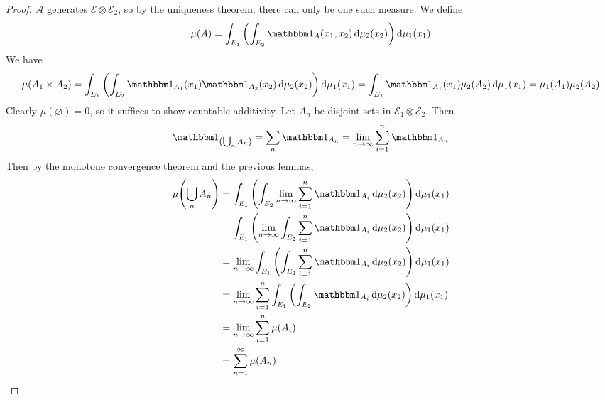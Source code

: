 \begin{proof}
	\( \mathcal A \) generates \( \mathcal E \otimes \mathcal E_2 \), so by the uniqueness theorem, there can only be one such measure.
	We define
	\[ \mu(A) = \int_{E_1} \qty( \int_{E_2} \mathbbm 1_A(x_1,x_2) \dd{\mu_2(x_2)} ) \dd{\mu_1(x_1)} \]
	We have
	\[ \mu(A_1 \times A_2) = \int_{E_1} \qty( \int_{E_2} \mathbbm 1_{A_1}(x_1) \mathbbm 1_{A_2}(x_2) \dd{\mu_2(x_2)} ) \dd{\mu_1(x_1)} = \int_{E_1} \mathbbm 1_{A_1}(x_1) \mu_2(A_2) \dd{\mu_1(x_1)} = \mu_1(A_1) \mu_2(A_2) \]
	Clearly \( \mu(\varnothing) = 0 \), so it suffices to show countable additivity.
	Let \( A_n \) be disjoint sets in \( \mathcal E_1 \otimes \mathcal E_2 \).
	Then
	\[ \mathbbm 1_{\qty(\bigcup_n A_n)} = \sum_n \mathbbm 1_{A_n} = \lim_{n \to \infty} \sum_{i=1}^n \mathbbm 1_{A_n} \]
	Then by the monotone convergence theorem and the previous lemmas,
	\begin{align*}
		\mu\qty(\bigcup_n A_n) &= \int_{E_1} \qty( \int_{E_2} \lim_{n \to \infty} \sum_{i=1}^n \mathbbm 1_{A_i} \dd{\mu_2(x_2)} ) \dd{\mu_1(x_1)} \\
		&= \int_{E_1} \qty( \lim_{n \to \infty} \int_{E_2} \sum_{i=1}^n \mathbbm 1_{A_i} \dd{\mu_2(x_2)} ) \dd{\mu_1(x_1)} \\
		&= \lim_{n \to \infty} \int_{E_1} \qty( \int_{E_2} \sum_{i=1}^n \mathbbm 1_{A_i} \dd{\mu_2(x_2)} ) \dd{\mu_1(x_1)} \\
		&= \lim_{n \to \infty} \sum_{i=1}^n \int_{E_1} \qty( \int_{E_2} \mathbbm 1_{A_i} \dd{\mu_2(x_2)} ) \dd{\mu_1(x_1)} \\
		&= \lim_{n \to \infty} \sum_{i=1}^n \mu(A_i) \\
		&= \sum_{n=1}^\infty \mu(A_n)
	\end{align*}
\end{proof}

